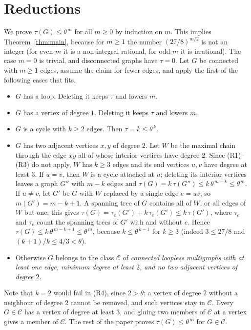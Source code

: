 \documentclass[11pt]{amsart}
\theoremstyle{plain}
\theoremstyle{remark}
\newcommand{\cC}{\mathcal{C}}
\newcommand{\tht}{\theta}
\begin{document}
\section{Reductions}\label{sec:red}

We prove $\tau(G)\le\tht^{\,m}$ for all $m\ge0$ by induction on $m$. This implies Theorem~\ref{thm:main}, because
for $m\ge1$ the number $(27/8)^{m/2}$ is not an integer (for even $m$ it is a non-integral rational, for odd $m$
it is irrational). The case $m=0$ is trivial, and disconnected graphs have $\tau=0$. Let $G$ be connected with
$m\ge1$ edges, assume the claim for fewer edges, and apply the first of the following cases that fits.

\begin{itemize}
\item[(R1)] $G$ has a loop. Deleting it keeps $\tau$ and lowers $m$.
\item[(R2)] $G$ has a vertex of degree $1$. Deleting it keeps $\tau$ and lowers $m$.
\item[(R3)] $G$ is a cycle with $k\ge2$ edges. Then $\tau=k\le\tht^{\,k}$.
\item[(R4)] $G$ has two adjacent vertices $x,y$ of degree $2$. Let $W$ be the maximal chain through the edge $xy$
  all of whose interior vertices have degree $2$. Since (R1)--(R3) do not apply, $W$ has $k\ge3$ edges and its end
  vertices $u,v$ have degree at least $3$.
  If $u=v$, then $W$ is a cycle attached at $u$; deleting its interior vertices leaves a graph $G''$ with $m-k$
  edges and $\tau(G)=k\,\tau(G'')\le k\,\tht^{\,m-k}\le\tht^{\,m}$.
  If $u\ne v$, let $G'$ be $G$ with $W$ replaced by a single edge $e=uv$, so $m(G')=m-k+1$. A spanning tree of $G$
  contains all of $W$, or all edges of $W$ but one; this gives
  $\tau(G)=\tau_e(G')+k\,\tau_{\bar e}(G')\le k\,\tau(G')$, where $\tau_e$ and $\tau_{\bar e}$ count the spanning trees
  of $G'$ with and without $e$. Hence $\tau(G)\le k\,\tht^{\,m-k+1}\le\tht^{\,m}$, because $k\le\tht^{\,k-1}$ for
  $k\ge3$ (indeed $3\le27/8$ and $(k+1)/k\le4/3<\tht$).
\item[(R5)] Otherwise $G$ belongs to the class $\cC$ of \emph{connected loopless multigraphs with at least one
  edge, minimum degree at least $2$, and no two adjacent vertices of degree $2$.}
\end{itemize}
Note that $k=2$ would fail in (R4), since $2>\tht$: a vertex of degree $2$ without a neighbour of degree $2$
cannot be removed, and such vertices stay in $\cC$. Every $G\in\cC$ has a vertex of degree at least $3$, and gluing two members of $\cC$ at a vertex gives a
member of $\cC$. The rest of the paper proves $\tau(G)\le\tht^{\,m}$ for $G\in\cC$.
\end{document}
